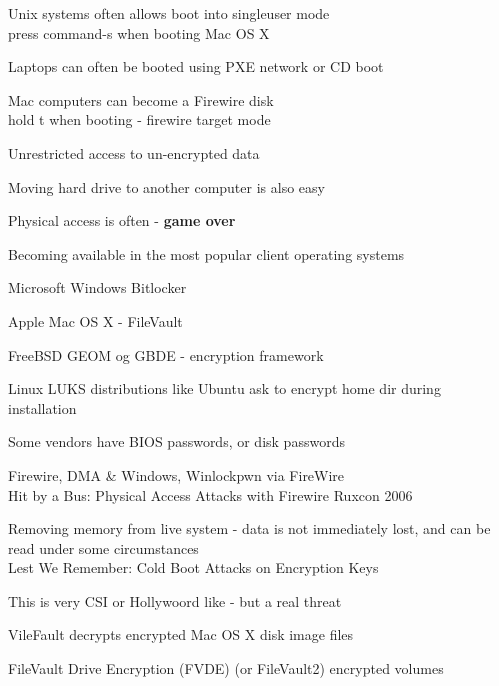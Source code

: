 \documentclass[Screen16to9,17pt]{foils}
\begin{document}
\begin{list1}
\item Unix systems often allows boot into singleuser mode\\
press command-s when booting Mac OS X
\item Laptops can often be booted using PXE network or CD boot
\item Mac computers can become a Firewire disk\\
hold t when booting - firewire target mode
\item Unrestricted access to un-encrypted data
\item Moving hard drive to another computer is also easy
\end{list1}
\pause
\centerline{Physical access is often - {\bf game over}}




\begin{list1}
\item Becoming available in the most popular client operating systems
\begin{list2}
\item Microsoft Windows Bitlocker
\item Apple Mac OS X - FileVault
\item FreeBSD GEOM og GBDE - encryption framework
\item Linux LUKS distributions like Ubuntu ask to encrypt home dir during installation
\item Some vendors have BIOS passwords, or disk passwords
\end{list2}
\end{list1}



\begin{list1}
\item Firewire, DMA \& Windows, Winlockpwn via FireWire\\
Hit by a Bus: Physical Access Attacks with Firewire Ruxcon 2006
\vskip 5mm
\item Removing memory from live system - data is not immediately lost, and can be read under some circumstances\\
Lest We Remember: Cold Boot Attacks on Encryption Keys\\
\item This is very CSI or Hollywoord like - but a real threat
\item VileFault decrypts encrypted Mac OS X disk image files\\ 

\item  FileVault Drive Encryption (FVDE) (or FileVault2) encrypted volumes\\
\end{list1}
\end{document}
